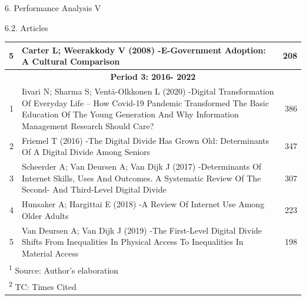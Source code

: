 \documentclass[
  ignorenonframetext,
]{beamer}
\begin{document}
\begin{frame}{6. Performance Analysis V}
\begin{block}{6.2. Articles}
\begin{table}
\begin{tabular}[t]{r|p{9cm}|r}
\hline
\hspace{1em}5 & Carter L; Weerakkody V (2008) -E-Government Adoption: A Cultural Comparison & 208\\
\hline
\multicolumn{3}{c}{\textbf{Period 3: 2016- 2022}}\\
\hline
\hspace{1em}1 & Iivari N; Sharma S; Ventä-Olkkonen L (2020) -Digital Transformation Of Everyday Life – How Covid-19 Pandemic Transformed The Basic Education Of The Young Generation And Why Information Management Research Should Care? & 386\\
\hline
\hspace{1em}2 & Friemel T (2016) -The Digital Divide Has Grown Old: Determinants Of A Digital Divide Among Seniors & 347\\
\hline
\hspace{1em}3 & Scheerder A; Van Deursen A; Van Dijk J (2017) -Determinants Of Internet Skills, Uses And Outcomes. A Systematic Review Of The Second- And Third-Level Digital Divide & 307\\
\hline
\hspace{1em}4 & Hunsaker A; Hargittai E (2018) -A Review Of Internet Use Among Older Adults & 223\\
\hline
\hspace{1em}5 & Van Deursen A; Van Dijk J (2019) -The First-Level Digital Divide Shifts From Inequalities In Physical Access To Inequalities In Material Access & 198\\
\hline
\multicolumn{3}{l}{\textsuperscript{1} Source: Author's elaboration}\\
\multicolumn{3}{l}{\textsuperscript{2} TC: Times Cited}\\
\end{tabular}
\end{table}
\end{block}
\end{frame}
\end{document}
